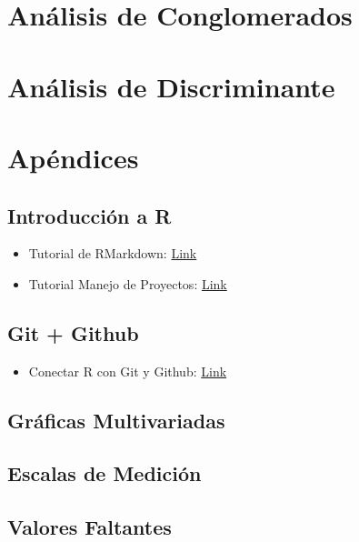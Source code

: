 \documentclass[
]{book}
\providecommand{\tightlist}{%
  \setlength{\itemsep}{0pt}\setlength{\parskip}{0pt}}
\begin{document}
\chapter{Análisis de Conglomerados}\label{anuxe1lisis-de-conglomerados}

\chapter{Análisis de Discriminante}\label{anuxe1lisis-de-discriminante}

\chapter{Apéndices}\label{apuxe9ndices}

\section{Introducción a R}\label{introducciuxf3n-a-r}

\begin{itemize}
\item
  Tutorial de RMarkdown: \href{https://github.com/HaydeePeruyero/Rmarkdown_and_LaTeX/blob/main/ejemplo.Rmd}{Link}
\item
  Tutorial Manejo de Proyectos: \href{https://haydeeperuyero.github.io/Seminario_Estadistica/manejo-de-proyectos.html}{Link}
\end{itemize}

\section{Git + Github}\label{git-github}

\begin{itemize}
\tightlist
\item
  Conectar R con Git y Github: \href{https://r-ladies-morelia.github.io/blog/conectar/}{Link}
\end{itemize}

\section{Gráficas Multivariadas}\label{gruxe1ficas-multivariadas}

\section{Escalas de Medición}\label{escalas-de-mediciuxf3n}

\section{Valores Faltantes}\label{valores-faltantes}

  
\end{document}
